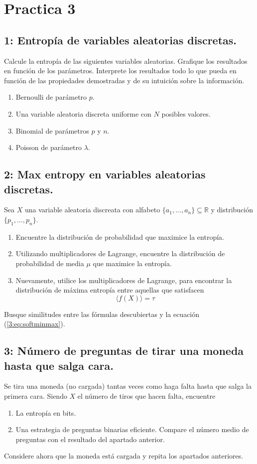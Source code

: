 \newpage
\section*{Practica 3}
\subsection*{1: Entrop\'ia de variables aleatorias discretas.}
Calcule la entrop\'ia de las siguientes variables aleatorias. Grafique los resultados en funci\'on de los par\'ametros. Interprete los resultados todo lo que pueda en funci\'on de las propiedades demostradas y de su intuici\'on sobre la informaci\'on.
\begin{enumerate}
    \item Bernoulli de par\'ametro $p$.
    \item Una variable aleatoria discreta uniforme con $N$ posibles valores.
    \item Binomial de par\'ametros $p$ y $n$.
    \item Poisson de par\'ametro $\lambda$.
\end{enumerate}

\subsection*{2: Max entropy en variables aleatorias discretas.}
Sea $X$ una variable aleatoria discreata con alfabeto $\{a_1,...,a_n\} \subseteq \mathbb{R}$ y distribuci\'on $\{p_1,...,p_n\}$.
\begin{enumerate}
    \item Encuentre la distribuci\'on de probabilidad que maximice la entrop\'ia.
    \item Utilizando multiplicadores de Lagrange, encuentre la distribuci\'on de probabilidad de media $\mu$ que maximice la entrop\'ia.
    \item Nuevamente, utilice los multiplicadores de Lagrange, para encontrar la distribuci\'on de m\'axima entrop\'ia entre aquellas que satisfacen 
    \begin{equation}
        \langle f(X) \rangle = \tau
    \end{equation}
\end{enumerate}
Busque similitudes entre las f\'ormulas descubiertas y la ecuaci\'on (\ref{3:eq:softminmax}).

\subsection*{3: N\'umero de preguntas de tirar una moneda hasta que salga cara.}
Se tira una moneda (no cargada) tantas veces como haga falta hasta que salga la primera cara. Siendo $X$ el n\'umero de tiros que hacen falta, encuentre
\begin{enumerate}
    \item La entrop\'ia en bits.
    \item Una estrategia de preguntas binarias eficiente. Compare el n\'umero medio de preguntas con el resultado del apartado anterior.
\end{enumerate}
Considere ahora que la moneda est\'a cargada y repita los apartados anteriores.


